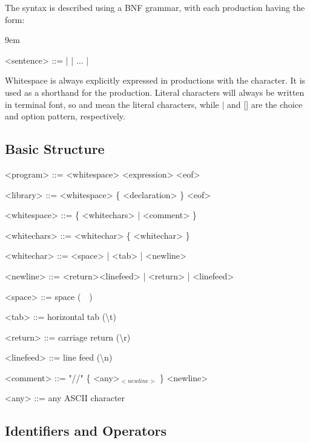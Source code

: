 \documentclass{article}
\begin{document}
\medskip

The syntax is described using a BNF grammar, with each production having the form:

\grammarindent9em
\begin{grammar}
    <sentence> ::=  |  | $\ldots$ | 
\end{grammar}

Whitespace is always explicitly expressed in productions with the \textvisiblespace{} character.
It is used as a shorthand for the  production.
Literal characters will always be written in terminal font, so \lit*{|} and \lit*{[]} mean the literal characters, while $|$ and [] are the choice and option pattern, respectively.

\subsection{Basic Structure}

\begin{grammar}
  <program> ::= <whitespace> <expression> <eof>

  <library> ::= <whitespace> \{ <declaration> \} <eof>
\end{grammar}

\begin{grammar}
  <whitespace> ::= \{ <whitechars> | <comment> \}

  <whitechars> ::= <whitechar> \{ <whitechar> \}

  <whitechar> ::= <space> | <tab> | <newline>

  <newline> ::= <return><linefeed> | <return> | <linefeed>

  <space> ::= space (\textquotesingle \ \ \textquotesingle)

  <tab> ::= horizontal tab (\textquotesingle \textbackslash t\textquotesingle)

  <return> ::= carriage return (\textquotesingle \textbackslash r\textquotesingle)

  <linefeed> ::= line feed (\textquotesingle \textbackslash n\textquotesingle)
\end{grammar}

\begin{grammar}
  <comment> ::= "//" \{ <any>$_{<newline>}$ \} <newline>

  <any> ::= any ASCII character
\end{grammar}

\subsection{Identifiers and Operators}
\end{document}
